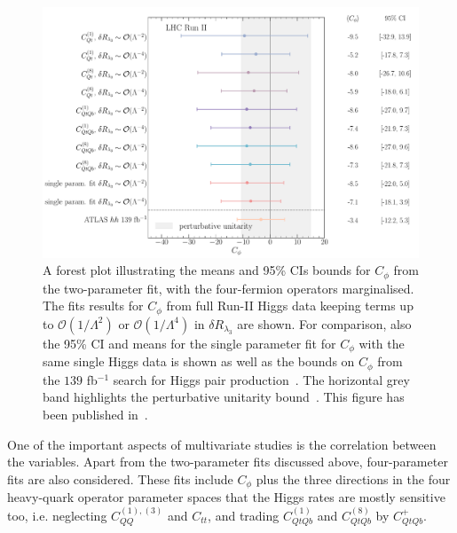 	\begin{figure}[htpb!]
		\begin{center}
			\includegraphics[width=\linewidth]{fig/uebeblick_forest_cphi_LHC_RunII}
		\end{center}
		\caption{A forest plot illustrating the means and 95\% CIs bounds for $C_\phi$ from the two-parameter fit, with the four-fermion operators marginalised. The fits results for $C_\phi$ from full Run-II Higgs data keeping terms up to $\mathcal{O}(1/\Lambda^2)$ or $\mathcal{O}(1/\Lambda^4)$ in $\delta R_{\lambda_3}$ are shown.  For comparison, also the 95\% CI and means for the single parameter fit for $C_\phi$ with the same single Higgs data is shown as well as the bounds on $C_{\phi}$ from the $139$ fb$^{-1}$ search for Higgs pair production~\cite{ATLAS:2021jki}. The horizontal grey band highlights the perturbative unitarity bound~\cite{DiLuzio:2017tfn}. This figure has been published in~\cite{Alasfar:2022zyr}.\label{fig:summcphi}  }
	\end{figure}
	\par 
	One of the important aspects of multivariate studies is the correlation between the variables. Apart from the two-parameter fits discussed above, four-parameter fits are also considered. These fits include $C_\phi$ plus the three directions in the four heavy-quark operator parameter spaces that the Higgs rates are
	mostly sensitive too, i.e. neglecting $C_{QQ}^{(1),(3) }$ and $C_{tt}$, and trading $C_{QtQb}^{(1)}$ and $C_{QtQb}^{(8)}$ by $C_{QtQb}^{+}$.

